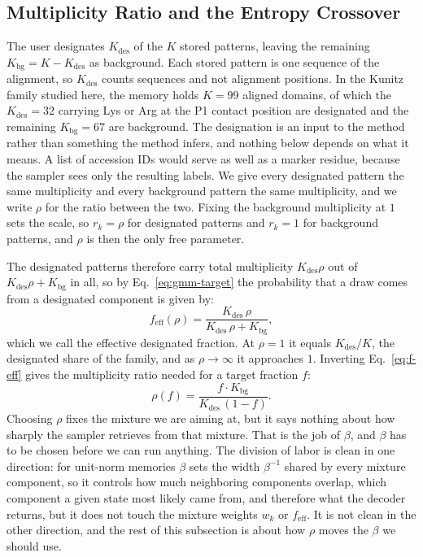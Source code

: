 \subsection{Multiplicity Ratio and the Entropy Crossover}\label{sec:phase}

The user designates $K_{\mathrm{des}}$ of the $K$ stored patterns, leaving the
remaining $K_{\mathrm{bg}} = K - K_{\mathrm{des}}$ as background. Each stored pattern is one
sequence of the alignment, so $K_{\mathrm{des}}$ counts sequences and not alignment positions.
In the Kunitz family studied here, the memory holds $K = 99$ aligned domains, of which the
$K_{\mathrm{des}} = 32$ carrying Lys or Arg at the P1 contact position are designated and the
remaining $K_{\mathrm{bg}} = 67$ are background. The designation is
an input to the method rather than something the method infers, and nothing below
depends on what it means. A list of accession IDs would serve as well as a marker residue,
because the sampler sees only the resulting labels. We give every designated pattern the same
multiplicity and every background pattern the same multiplicity, and we write $\rho$
for the ratio between the two. Fixing the background multiplicity at $1$ sets the
scale, so $r_k = \rho$ for designated patterns and $r_k = 1$ for background
patterns, and $\rho$ is then the only free parameter.

The designated patterns therefore carry total multiplicity $K_{\mathrm{des}}\rho$
out of $K_{\mathrm{des}}\rho + K_{\mathrm{bg}}$ in all, so by
Eq.~\eqref{eq:gmm-target} the probability that a draw comes from a designated
component is given by:
\begin{equation}\label{eq:f-eff}
  f_{\mathrm{eff}}(\rho)
  = \frac{K_{\mathrm{des}}\,\rho}{K_{\mathrm{des}}\,\rho + K_{\mathrm{bg}}} ,
\end{equation}
which we call the effective designated fraction. At $\rho=1$ it equals
$K_{\mathrm{des}}/K$, the designated share of the family, and as $\rho \to \infty$
it approaches $1$. Inverting Eq.~\eqref{eq:f-eff} gives the multiplicity ratio
needed for a target fraction $f$:
\begin{equation}\label{eq:rho-inverse}
  \rho(f) = \frac{f \cdot K_{\mathrm{bg}}}{K_{\mathrm{des}}\,(1-f)}.
\end{equation}
Choosing $\rho$ fixes the mixture we are aiming at, but it says nothing about how
sharply the sampler retrieves from that mixture. That is the job of $\beta$, and
$\beta$ has to be chosen before we can run anything. The division of labor is clean in
one direction: for unit-norm memories $\beta$ sets the width $\beta^{-1}$ shared by
every mixture component, so it controls how much neighboring components overlap, which
component a given state most likely came from, and therefore what the decoder returns,
but it does not touch the mixture weights $w_k$ or $f_{\mathrm{eff}}$. It is not clean
in the other direction, and the rest of this subsection is about how $\rho$ moves the
$\beta$ we should use.

